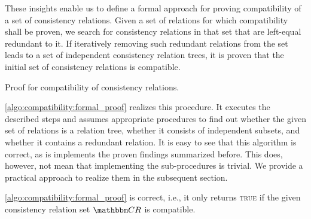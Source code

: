 These insights enable us to define a formal approach for proving compatibility of a set of consistency relations.
Given a set of relations for which compatibility shall be proven, we search for consistency relations in that set that are left-equal redundant to it.
If iteratively removing such redundant relations from the set leads to a set of independent consistency relation trees, it is proven that the initial set of consistency relations is compatible.

\begin{algorithm}
    
    \caption[Proof for compatibility of consistency relations]{Proof for compatibility of consistency relations.}
    \label{algo:compatibility:formal_proof}
\end{algorithm}

\autoref{algo:compatibility:formal_proof} realizes this procedure.
It executes the described steps and assumes appropriate procedures to find out whether the given set of relations is a relation tree, whether it consists of independent subsets, and whether it contains a redundant relation.
It is easy to see that this algorithm is correct, as is implements the proven findings summarized before.
This does, however, not mean that implementing the sub-procedures is trivial.
We provide a practical approach to realize them in the subsequent section.

\begin{theorem}
    \label{theorem:compatibilityalgorithmcorrectness}
    \autoref{algo:compatibility:formal_proof} is correct, i.e., it only returns \textsc{true} if the given consistency relation set $\consistencyrelationset{CR}$ is compatible.
\end{theorem}

